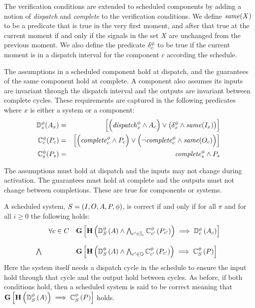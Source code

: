The verification conditions are extended to scheduled components by adding a notion of \textit{dispatch} and \textit{complete} to the verification conditions.
We define $\mathit{same}(X)$ to be a predicate that is true in the very first moment, and after that true at the current moment if and only if the signals in the set $X$ are unchanged from the previous moment.
We also define the predicate $\delta^\phi_c$ to be true if the current moment is in a dispatch interval for the component $c$ according the schedule.

The assumptions in a scheduled component hold at dispatch, and the guarantees of the same component hold at complete.
A component also assumes its inputs are invariant through the dispatch interval and the outputs are invariant between complete cycles.
These requirements are captured in the following predicates where $x$ is either a system or a component:
\begin{eqnarray*}
  \mathbb{D}^\phi_x(A_x) &=& \left[\left(\mathit{dispatch}^{\phi}_x \wedge A_c\right) \vee \left(\delta^\phi_x \wedge \mathit{same}(I_x)\right)\right] \\
  \mathbb{C}^\phi_c(P_c) &=& \left[\left(\mathit{complete}^{\phi}_c \wedge P_c\right) \vee \left(\neg\mathit{complete}^{\phi}_c \wedge \mathit{same}(O_c)\right)\right] \\
  \mathbb{C}^\phi_s(P_s) &=& \mathit{complete}^{\phi}_s \wedge P_s
\end{eqnarray*}

The assumptions must hold at dispatch and the inputs may not change during activation.
The guarantees must hold at complete and the outputs must not change between completions.
These are true for components or systems.

A scheduled system, $S = (I, O, A, P, \phi)$, is correct if and only if for all $\pi$ and for all $i \ge 0$ the following holds:
\[
\begin{array}{lll}
        & \forall c \in C &  
            \mathbf{G}\left[\mathbf{H}\left(\mathbb{D}^\phi_S\left(A\right) \wedge 
            \bigwedge_{c^\prime \in \mathbb{I}_c} \mathbb{C}^\phi_{c^\prime}\left(P_{c^\prime}\right)\right) 
            \implies \mathbb{D}^\phi_c\left(A_c\right)\right] \\ \\
 \bigwedge &   & 
            \mathbf{G}\left[\mathbf{H}\left(\mathbb{D}^\phi_S\left(A\right) \wedge 
            \bigwedge_{c^\prime \in \mathbb{O}} \mathbb{C}^\phi_{c^\prime}\left(P_{c^\prime}\right)\right)
            \implies \mathbb{C}^\phi_{S}\left(P\right)\right]
\end{array}
\]
Here the system itself needs a dispatch cycle in the schedule to ensure the input hold through that cycle and the output hold between cycles. As before, if both conditions hold, then a scheduled system is said to be correct meaning that $\mathbf{G}\left[\mathbf{H}\left(\mathbb{D}^\phi_S\left(A\right)\right) 
\implies \mathbb{C}^\phi_{S}\left(P\right)\right]$ holds.
